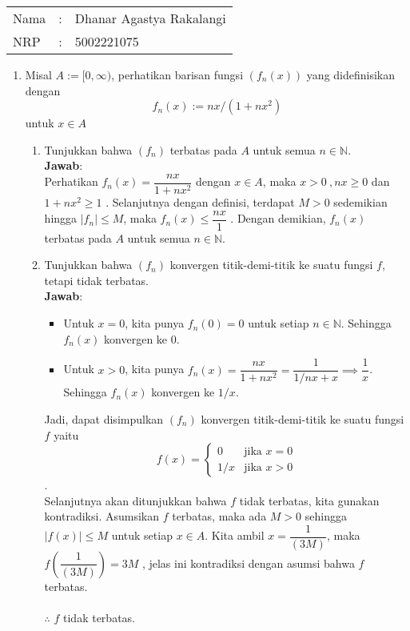 \documentclass[a4paper, 12pt]{article}
\newcommand{\ans}{\textbf{Jawab}:}
\newcommand{\N}{\mathbb{N}}
\begin{document}
    \begin{tabular}{|lcl|}
     \hline
     Nama&:&Dhanar Agastya Rakalangi\\
     NRP&:&5002221075\\
     \hline
    \end{tabular}

    \begin{enumerate}
       \item Misal $A:=[0,\infty)$, perhatikan barisan fungsi $(f_n(x))$ yang didefinisikan dengan $$f_n(x):=nx/(1+nx^2)$$ untuk $x\in A$
        \begin{enumerate}
            \item Tunjukkan bahwa $(f_n)$ terbatas pada $A$ untuk semua $n\in\N$.\\
            \ans \\
            Perhatikan $f_n(x)=\dfrac{nx}{1+nx^2}$ dengan $x \in A$, maka $x > 0 \ , nx \geq 0$ dan $1+nx^2 \geq 1$ . Selanjutnya dengan definisi, terdapat $M>0$ sedemikian hingga $|f_n| \leq M$, maka $f_n(x) \leq \dfrac{nx}{1}$ .
            Dengan demikian, $f_n(x)$ terbatas pada $A$ untuk semua $n\in\N$.

             \item Tunjukkan bahwa $(f_n)$ konvergen titik-demi-titik ke suatu fungsi $f$, tetapi tidak terbatas.\\
             \ans
            \begin{itemize}
                \item Untuk $x=0$, kita punya $f_n(0)=0$ untuk setiap $n\in\N$. Sehingga $f_n(x)$ konvergen ke $0$.
                \item Untuk $x>0$, kita punya $f_n(x)=\dfrac{nx}{1+nx^2}=\dfrac{1}{1/nx+x}\implies\dfrac{1}{x}$. 
                Sehingga $f_n(x)$ konvergen ke $1/x$.
            \end{itemize}
            Jadi, dapat disimpulkan $(f_n)$ konvergen titik-demi-titik ke suatu fungsi $f$ yaitu 
            $$f(x)=\begin{cases}0&\text{jika }x=0\\1/x&\text{jika }x>0\end{cases}$$.\\
            Selanjutnya akan ditunjukkan bahwa $f$ tidak terbatas, kita gunakan kontradiksi. Asumsikan $f$ terbatas, maka ada $M>0$ sehingga $|f(x)|\leq M$ untuk setiap $x\in A$. Kita ambil $x=\dfrac{1}{(3M)}$, maka $f\left(\dfrac{1}{(3M)}\right)=3M$ , jelas ini kontradiksi dengan asumsi bahwa $f$ terbatas.\\\\
            $\therefore$ $f$ tidak terbatas.\\


\end{enumerate}
\end{enumerate}
\end{document}
